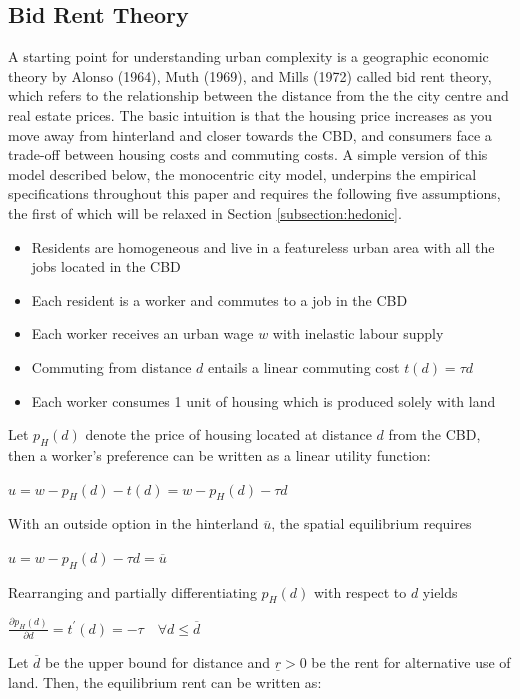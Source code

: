 \documentclass{article}
\begin{document}
\subsection{Bid Rent Theory} \label{subsection:monocentric}
A starting point for understanding urban complexity is a geographic economic theory by Alonso (1964), Muth (1969), and Mills (1972) called bid rent theory, which refers to the relationship between the distance from the the city centre and real estate prices. The basic intuition is that the housing price increases as you move away from hinterland and closer towards the CBD, and consumers face a trade-off between housing costs and commuting costs. A simple version of this model described below, the monocentric city model, underpins the empirical specifications throughout this paper and requires the following five assumptions, the first of which will be relaxed in Section \ref{subsection:hedonic}.
\begin{itemize}
\setlength\itemsep{0.1em}
\item Residents are homogeneous and live in a featureless urban area with all the jobs located in the CBD
\item Each resident is a worker and commutes to a job in the CBD
\item Each worker receives an urban wage $w$ with inelastic labour supply
\item Commuting from distance $d$ entails a linear commuting cost $t(d) = \tau d$
\item Each worker consumes 1 unit of housing which is produced solely  with land
\end{itemize}
Let $p_H (d)$ denote the price of housing located at distance $d$ from the CBD, then a worker's preference can be written as a linear utility function:
\begin{center}
$u = w - p _ { H } ( d ) - t ( d ) = w - p _ { H } ( d ) - \tau d$
\end{center}
With an outside option in the hinterland $\overline{u}$, the spatial equilibrium requires
\begin{center}
$u = w - p _ { H } ( d ) - \tau d = \overline { u }$
\end{center}
Rearranging and partially differentiating $p_H (d)$ with respect to $d$ yields 
\begin{center}
$\frac { \partial p _ { H } ( d ) } { \partial d } = t ^ { \prime } ( d ) = - \tau \quad \forall d \leq \overline { d }$
\end{center}
Let $\overline{d}$ be the upper bound for distance and $\underline{r} > 0$ be the rent for alternative use of land. Then, the equilibrium rent can be written as:
\end{document}
